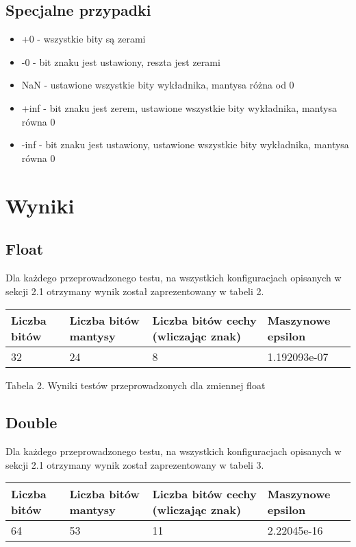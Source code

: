 \documentclass{article}
\begin{document}
\subsection{Specjalne przypadki}

\begin{itemize}
\item +0 - wszystkie bity są zerami
\item -0 - bit znaku jest ustawiony, reszta jest zerami
\item NaN - ustawione wszystkie bity wykładnika, mantysa różna od 0
\item +inf  - bit znaku jest zerem, ustawione wszystkie bity wykładnika, mantysa równa 0
\item -inf - bit znaku jest ustawiony, ustawione wszystkie bity wykładnika, mantysa równa 0
\end{itemize}


\section{Wyniki}

\subsection{Float}

Dla każdego przeprowadzonego testu, na wszystkich konfiguracjach opisanych w sekcji 2.1 otrzymany wynik został zaprezentowany w tabeli 2.

\begin{table}[!ht]
    \centering
    \begin{tabular}{|l|l|l|l|}
    \hline
        Liczba bitów & Liczba bitów mantysy & Liczba bitów cechy (wliczając znak) & Maszynowe epsilon  \\ \hline
        32 & 24 & 8 & 1.192093e-07 \\ \hline
    \end{tabular}
\end{table}
\centerline{Tabela 2. Wyniki testów przeprowadzonych dla zmiennej float}

\subsection{Double}

Dla każdego przeprowadzonego testu, na wszystkich konfiguracjach opisanych w sekcji 2.1 otrzymany wynik został zaprezentowany w tabeli 3.

\begin{table}[!ht]
    \centering
    \begin{tabular}{|l|l|l|l|}
    \hline
        Liczba bitów & Liczba bitów mantysy & Liczba bitów cechy (wliczając znak) & Maszynowe epsilon  \\ \hline
        64 & 53 & 11 & 2.22045e-16 \\ \hline
    \end{tabular}
\end{table}
\end{document}
